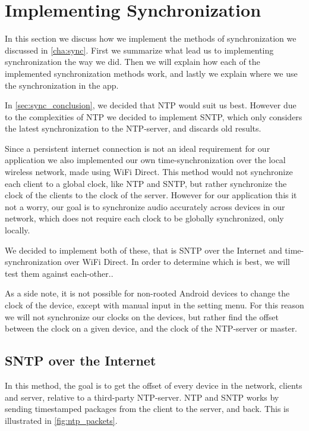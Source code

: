 \section{Implementing Synchronization}\label{sec:impl_sync}
In this section we discuss how we implement the methods of synchronization we discussed in \cref{cha:sync}.
First we summarize what lead us to implementing synchronization the way we did.
Then we will explain how each of the implemented synchronization methods work, and lastly we explain where we use the synchronization in the app.

In \cref{sec:sync_conclusion}, we decided that \ac{NTP} would suit us best.
However due to the complexities of \ac{NTP} we decided to implement \ac{SNTP}, which only considers the latest synchronization to the \ac{NTP}-server, and discards old results.

Since a persistent internet connection is not an ideal requirement for our application we also implemented our own time-synchronization over the local wireless network, made using WiFi Direct.
This method would not synchronize each client to a global clock, like \ac{NTP} and \ac{SNTP}, but rather synchronize the clock of the clients to the clock of the server.
However for our application this it not a worry, our goal is to synchronize audio accurately across devices in our network, which does not require each clock to be globally synchronized, only locally.

We decided to implement both of these, that is \ac{SNTP} over the Internet and time-synchronization over WiFi Direct.
In order to determine which is best, we will test them against each-other..

As a side note, it is not possible for non-rooted Android devices to change the clock of the device, except with manual input in the setting menu.
For this reason we will not synchronize our clocks on the devices, but rather find the offset between the clock on a given device, and the clock of the \ac{NTP}-server or master.

\subsection{\ac{SNTP} over the Internet}
In this method, the goal is to get the offset of every device in the network, clients and server, relative to a third-party \ac{NTP}-server.
\ac{NTP} and \ac{SNTP} works by sending timestamped packages from the client to the server, and back.
This is illustrated in \cref{fig:ntp_packets}.

